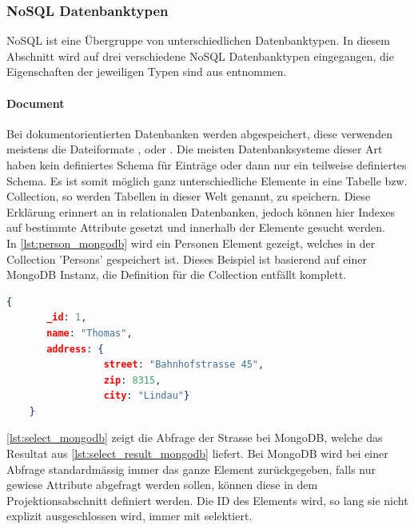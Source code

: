 \subsubsection{NoSQL Datenbanktypen}\label{no_sql_db_subgroups}
NoSQL ist eine Übergruppe von unterschiedlichen Datenbanktypen. In diesem Abschnitt wird auf drei verschiedene NoSQL Datenbanktypen eingegangen, die Eigenschaften der jeweiligen
 Typen sind aus \cite{vaish2013getting} entnommen.

\paragraph{Document}
Bei dokumentorientierten Datenbanken werden  abgespeichert, diese verwenden meistens die Dateiformate , 
 oder . Die meisten Datenbanksysteme dieser Art haben kein definiertes Schema für Einträge oder
dann nur ein teilweise definiertes Schema. Es ist somit möglich ganz unterschiedliche Elemente in eine Tabelle bzw. Collection, so werden Tabellen in dieser Welt genannt, zu speichern. Diese Erklärung 
erinnert an  in relationalen Datenbanken, jedoch können hier Indexes auf bestimmte Attribute gesetzt und innerhalb der Elemente gesucht werden.\\

In \autoref{lst:person_mongodb} wird ein Personen Element gezeigt, welches in der Collection 'Persons' gespeichert ist. Dieses Beispiel ist basierend auf einer MongoDB Instanz, die Definition 
für die Collection entfällt komplett.

\begin{lstlisting}[language=JSON, caption=Personen Element in JSON Format, label=lst:person_mongodb]  
    {
       _id: 1,
       name: "Thomas",
       address: {
                 street: "Bahnhofstrasse 45",
                 zip: 8315,
                 city: "Lindau"}
    }
\end{lstlisting}

\autoref{lst:select_mongodb} zeigt die Abfrage der Strasse bei MongoDB, welche das Resultat aus \autoref{lst:select_result_mongodb} liefert. Bei MongoDB wird bei einer Abfrage standardmässig 
immer das ganze Element zurückgegeben, falls nur gewiese Attribute abgefragt werden sollen, können diese in dem Projektionsabschnitt definiert werden. Die ID des Elements wird, so lang 
sie nicht explizit ausgeschlossen wird, immer mit selektiert.

